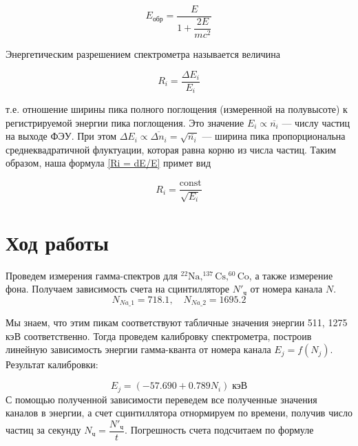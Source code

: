 \documentclass[a4paper,12pt]{article} %
\begin{document}
	\begin{equation}\label{Eobr}
		E_{обр} = \dfrac{E}{1 + \dfrac{2E}{mc^2}}
	\end{equation}
	
	Энергетическим разрешением спектрометра называется величина
	
	\begin{equation}\label{Ri = dE/E}
		R_i = \dfrac{\Delta E_i}{E_i}
	\end{equation}
	
	т.е. отношение ширины пика полного поглощения (измеренной на полувысоте) к регистрируемой энергии пика поглощения. Это значение $ E_i \propto \overline{n_i} $ --- числу частиц на выходе ФЭУ. При этом  $ \Delta E_i \propto \overline{\Delta n_i} = \sqrt{\overline{n_i}} $ --- ширина пика пропорциональна среднеквадратичной флуктуации, которая равна корню из числа частиц. Таким образом, наша формула \eqref{Ri = dE/E} примет вид
	
	\begin{equation}\label{Ri = c/E}
		R_i = \dfrac{\mathrm{const}}{\sqrt{E_i}}
	\end{equation}
	\section{Ход работы}
	Проведем измерения гамма-спектров для $ \mathrm{^{22}Na, ^{137}Cs, ^{60}Co}$, а также измерение фона. Получаем зависимость счета на сцинтилляторе $ N'_\text{ч} $ от номера канала $ N $. 
	\begin{equation}\label{}
		N_{Na\_1} = 718.1, \quad N_{Na\_2} = 1695.2
	\end{equation}
	
	Мы знаем, что этим пикам соответствуют табличные значения энергии 511, 1275 кэВ соответственно. Тогда проведем калибровку спектрометра, построив линейную зависимость энергии гамма-кванта от номера канала $ E_j = f(N_j) $. Результат калибровки:
	
	\begin{equation}\label{}
		E_j = (-57.690 + 0.789N_i ) \; \text{кэВ}
	\end{equation}
	С помощью полученной зависимости переведем все полученные значения каналов в энергии, а счет сцинтиллятора отнормируем по времени, получив число частиц за секунду $ N_\text{ч} = \dfrac{N'_\text{ч}}{t} $. Погрешность счета подсчитаем по формуле 
	
\end{document}
